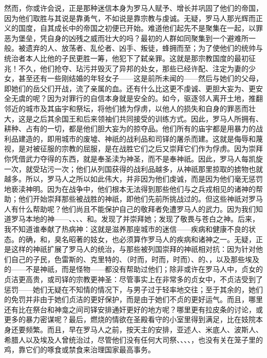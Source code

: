 然而，你或许会说，正是那种迷信本身为罗马人赋予、增长并巩固了他们的帝国，因为他们取胜与其说是靠勇气，不如说是靠宗教与虔诚。无疑，罗马人那光辉而正义的国度，自其成长中的帝国之初便已开始。难道他们起先不是聚集在一起，以罪恶为堡垒，凭自身的凶残之威而壮大的吗？最初的人群如同聚集到一个避难所一般。被遗弃的人、放荡者、乱伦者、凶手、叛徒，蜂拥而至；为了使他们的统帅与统治者本人比他的子民更胜一筹，他犯下了弑亲罪。这就是那宗教国度的最初征兆！不久，他们抢夺、玷污并毁灭了异邦的处女，那些已经许配、注定为妻的少女，甚至还有一些刚结婚的年轻女子——这是前所未闻的——然后与她们的父母，即她们的岳父们开战，流了亲属的血。还有什么比这更不虔诚、更胆大妄为、更安全无虞的呢？因为对罪行的自信本身就是安全的。如今，驱逐邻人离开土地，推翻邻近的城市及其庙宇和祭坛，将他们掳为俘虏，以他人的损失和自身的罪恶而壮大，这是之后其余国王和后来领袖们共同接受的训练方式。因此，罗马人所拥有、耕种、占有的一切，都是他们胆大妄为的掠夺品。他们所有的庙宇都是用暴力的战利品建造的，即用城市的废墟、神祇的战利品和司铎的屠杀而建。这就是侮辱和蔑视，是对被征服的宗教的屈服，是在战胜它们之后又崇拜它们作为俘虏。因为崇拜你凭借武力夺得的东西，就是奉圣渎为神圣，而不是奉神祇。因此，罗马人每凯旋一次，就受玷污一次；他们从列国获得的战利品越多，从神祇那里掠取的掳物也就越多。所以，罗马人之所以如此伟大，并非因为他们虔诚，而是因为他们毫无惩罚地亵渎神明。因为在战争中，他们根本无法得到那些他们与之兵戎相见的诸神的帮助；他们开始崇拜那些被战胜的神祇，即他们先前所挑战过的。但这些神祇对罗马人有什么帮助呢？他们尚且不能保护自己的敬拜者免遭罗马人的武力。因为我们知道罗马本地的神——、、、、和。发现了并崇拜她；发现了敬畏与苍白之神。后来，我不知道谁奉献了热病神：这就是滋养那座城市的迷信——疾病和健康不良的状态。的确，和，臭名昭著的妓女，也必须算作罗马人的疾病和诸神之一。无疑，正是这样的神祇扩展了罗马人的统治，与那些被列国崇拜的神祇相对抗：因为针对他们自己的子民，色雷斯的、克里特的、（时而，时而，时而）、的、，以及那些埃及的——不是神祇，而是怪物——都没有帮助过他们；除非或许在罗马人中，贞女的贞洁更高贵，或司铎的宗教更神圣：尽管事实上在非常多的贞女中，不贞洁受到了惩罚——她们无疑在不知情的情况下，与男子过于轻率地交往；至于其余的，她们的免罚并非由于她们贞洁的更好保护，而是由于她们不贞的更好运气。而且，哪里还有比在祭台和神龛之间司铎安排通奸更好的地方呢？哪里更有拉皮条的讨论，或更多的暴力密谋呢？最后，燃烧的情欲在圣殿看守的小室里得到满足，比在妓院本身还要频繁。而且，早在罗马人之前，按天主的安排，亚述人、米底人、波斯人、希腊人以及埃及人曾统治过，尽管他们没有任何大司祭、、、、，也没有关在笼子里的鸡，靠它们的啄食或禁食来治理国家最高事务。\par

